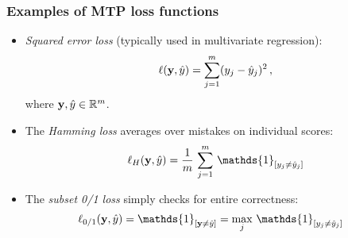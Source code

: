 \documentclass[11pt,compress,t,notes=noshow, xcolor=table]{beamer}
\begin{document}
\begin{frame}
	\frametitle{Examples of MTP loss functions}
	\begin{itemize}
		
		\small 
		\item \emph{Squared error loss} (typically used in multivariate regression):
		$$
		\ell(\mathbf{y}, \hat{y}) = \sum_{j=1}^m (y_j - \hat{y}_j)^2 \, ,
		$$
		where $\mathbf{y} , \hat{y} \in \mathbb{R}^m$.
		
		
		\medskip
		
		
		
		
		\item The \emph{Hamming loss} averages over mistakes on individual scores:    
		$$
		\displaystyle \ell_H(\yv, \hat{y}) = \frac{1}{m}  \, \sum_{j=1}^m \, \mathds{1}_{[y_j \neq  \hat y_j ]}
		$$
		
		\item The \emph{subset 0/1 loss} simply checks for entire correctness:  
		\begin{align*}
			\displaystyle \ell_{0/1}(\yv, \hat{y}) & = \mathds{1}_{[ \yv \ne \hat{y} ]}  =  \max_j \, \mathds{1}_{[y_j \neq  \hat y_j]}
		\end{align*}
		
		
	\end{itemize}
\end{frame}
\end{document}
